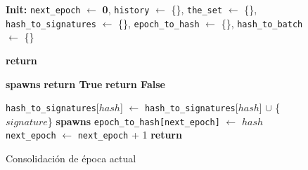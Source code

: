 \begin{figure}[t!]
  \begin{adjustbox}{minipage=[t]{\columnwidth}}
    \begin{algorithm}[H]
      \renewcommand{\thealgorithm}{ABCI Hashchain - Parte 1}
      \caption{Consolidación de época actual}%
      \label{alg:abci-hash1}%
      \small
      \begin{algorithmic}[1]
            \State \textbf{Init:} \texttt{next\_epoch} $\leftarrow$ \textbf{0}, \texttt{history} $\leftarrow$ \{\}, \texttt{the\_set} $\leftarrow$ \{\}, \texttt{hash\_to\_signatures} $\leftarrow$ \{\}, \texttt{epoch\_to\_hash} $\leftarrow$ \{\}, \texttt{hash\_to\_batch} $\leftarrow$ \{\}

            \label{alg:hash_check_tx}
            				\State \textbf{return} 
            			\EndIf

            		
                		\State \textbf{spawns} \label{line:spawn-reverse-checktx}
                		\State \textbf{return True}
                	\Else
                		\State \textbf{return False}
                	\EndIf
            		\EndFunction
      
            \label{alg:hash_deliver_tx}
            			\State \texttt{hash\_to\_signatures}[$hash$] $\leftarrow$ \texttt{hash\_to\_signatures}[$hash$] $\cup$  \{$signature$\}
							\State \textbf{spawns} 
						\EndIf
            				\State \texttt{epoch\_to\_hash[next\_epoch]} $\leftarrow$ $hash$
            				\State \texttt{next\_epoch} $\leftarrow$ \texttt{next\_epoch} + 1
               	 	\EndIf
               	 \EndIf
                \State \textbf{return}
            \EndFunction
            

\end{algorithmic}
\end{algorithm}
\end{adjustbox}
\end{figure}
